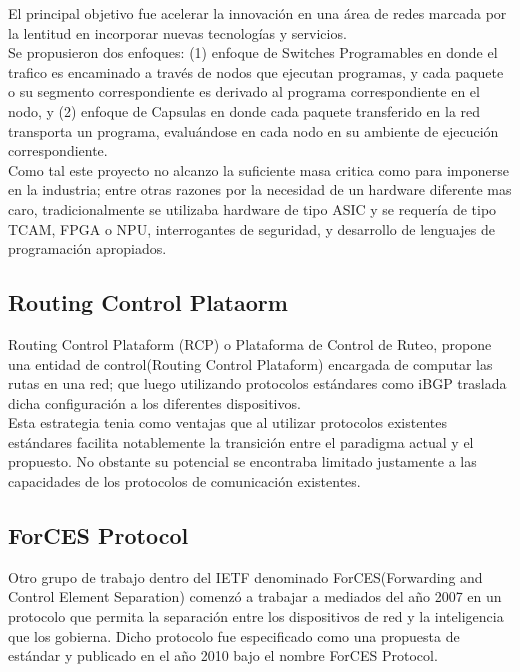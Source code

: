 El principal objetivo fue acelerar la innovación en una área de redes marcada por la lentitud en incorporar nuevas tecnologías y servicios.\\

Se propusieron dos enfoques: (1) enfoque de Switches Programables en donde el trafico es encaminado a través de nodos que ejecutan programas, y cada paquete o su segmento correspondiente es derivado al programa correspondiente en el nodo, y (2) enfoque de Capsulas en donde cada paquete transferido en la red transporta un programa, evaluándose en cada nodo en su ambiente de ejecución correspondiente.\\

Como tal este proyecto no alcanzo la suficiente masa critica como para imponerse en la industria; entre otras razones por la necesidad de un hardware diferente mas caro, tradicionalmente se utilizaba hardware de tipo ASIC y se requería de tipo TCAM, FPGA o NPU, interrogantes de seguridad, y desarrollo de lenguajes de programación apropiados.

\subsection{Routing Control Plataorm}
Routing Control Plataform (RCP)\citep{feamster2004case}\citep{caesar2005design} o Plataforma de Control de Ruteo, propone una entidad de control(Routing Control Plataform) encargada de computar las rutas en una red; que luego utilizando protocolos estándares como iBGP traslada dicha configuración a los diferentes dispositivos.\\ 

Esta estrategia tenia como ventajas que al utilizar protocolos existentes estándares facilita notablemente la transición entre el paradigma actual y el propuesto. No obstante su potencial 
se encontraba limitado justamente a las capacidades de los protocolos de comunicación existentes.

\subsection{ForCES Protocol}
Otro grupo de trabajo dentro del IETF denominado ForCES(Forwarding and Control Element Separation) comenzó a trabajar a mediados del año 2007 en un protocolo que permita la separación entre los dispositivos de red y la inteligencia que los gobierna. Dicho protocolo fue especificado como una propuesta de estándar y publicado en el año 2010 bajo el nombre ForCES Protocol\citep{doria2010forwarding}.

